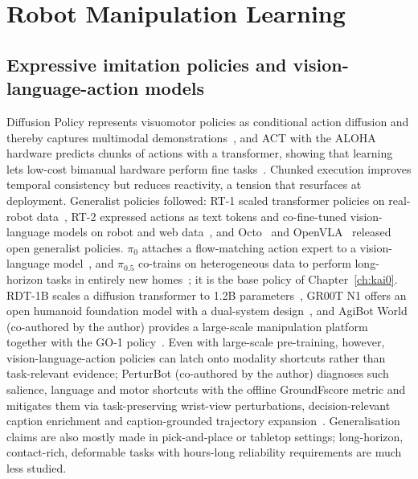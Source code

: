 \section{Robot Manipulation Learning}\label{sec:bg:manip}

\subsection{Expressive imitation policies and vision-language-action models}

Diffusion Policy represents visuomotor policies as conditional action diffusion and thereby captures multimodal demonstrations~\cite{chi2023diffusion}, and ACT with the ALOHA hardware predicts chunks of actions with a transformer, showing that learning lets low-cost bimanual hardware perform fine tasks~\cite{zhao2023aloha}. Chunked execution improves temporal consistency but reduces reactivity, a tension that resurfaces at deployment. Generalist policies followed: RT-1 scaled transformer policies on real-robot data~\cite{brohan2023rt1}, RT-2 expressed actions as text tokens and co-fine-tuned vision-language models on robot and web data~\cite{zitkovich2023rt2}, and Octo~\cite{team2024octo} and OpenVLA~\cite{kim2024openvla} released open generalist policies. $\pi_0$ attaches a flow-matching action expert to a vision-language model~\cite{black2024pi0}, and $\pi_{0.5}$ co-trains on heterogeneous data to perform long-horizon tasks in entirely new homes~\cite{black2025pi05}; it is the base policy of Chapter~\ref{ch:kai0}. RDT-1B scales a diffusion transformer to 1.2B parameters~\cite{liu2025rdt}, GR00T N1 offers an open humanoid foundation model with a dual-system design~\cite{nvidia2025gr00t}, and AgiBot World (co-authored by the author) provides a large-scale manipulation platform together with the GO-1 policy~\cite{bu2025agibot_iros}. Even with large-scale pre-training, however, vision-language-action policies can latch onto modality shortcuts rather than task-relevant evidence; PerturBot (co-authored by the author) diagnoses such salience, language and motor shortcuts with the offline GroundFscore metric and mitigates them via task-preserving wrist-view perturbations, decision-relevant caption enrichment and caption-grounded trajectory expansion~\cite{liu2026perturbot}. Generalisation claims are also mostly made in pick-and-place or tabletop settings; long-horizon, contact-rich, deformable tasks with hours-long reliability requirements are much less studied.

